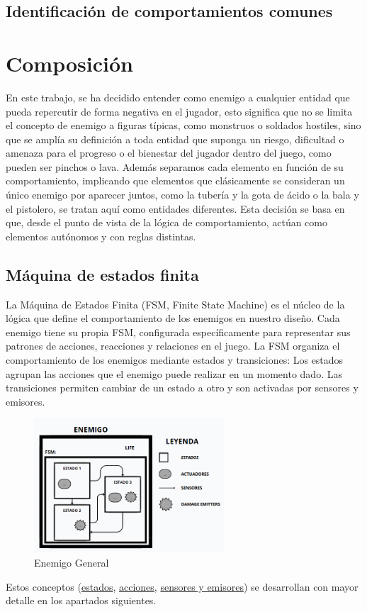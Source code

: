 \subsection{Identificación de comportamientos comunes}


\section{Composición}
En este trabajo, se ha decidido entender como enemigo a cualquier entidad que pueda repercutir de forma negativa en el jugador, esto significa que no se limita el concepto de enemigo a figuras típicas, como monstruos o soldados hostiles, sino que se amplía su definición a toda entidad que suponga un riesgo, dificultad o amenaza para el progreso o el bienestar del jugador dentro del juego, como pueden ser pinchos o  lava.
Además separamos cada elemento en función de su comportamiento, implicando que elementos que clásicamente se consideran un único enemigo por aparecer juntos, como la tubería y la gota de ácido o la bala y el pistolero, se tratan aquí como entidades diferentes. Esta decisión se basa en que, desde el punto de vista de la lógica de comportamiento, actúan como elementos autónomos y con reglas distintas.\\


\subsection{Máquina de estados finita}

La Máquina de Estados Finita (FSM, Finite State Machine) es el núcleo de la lógica que define el comportamiento de los enemigos en nuestro diseño. Cada enemigo tiene su propia FSM, configurada específicamente para representar sus patrones de acciones, reacciones y relaciones en el juego. La FSM organiza el comportamiento de los enemigos mediante estados y transiciones:
Los estados agrupan las acciones que el enemigo puede realizar en un momento dado.
Las transiciones permiten cambiar de un estado a otro y son activadas por sensores y emisores.\\

\begin{figure}[!h]
	\centering
	\includegraphics[height=5cm]{Imagenes/EnemigoGeneral.png}
	\caption{Enemigo General }
	\label{fig:EnemigoGeneral}
\end{figure}
Estos conceptos (\hyperref[subsec:estado]{estados}, \hyperref[subsec:acciones]{acciones}, \hyperref[subsec:sensores y emisores]{sensores y emisores}) se desarrollan con mayor detalle en los apartados siguientes.

